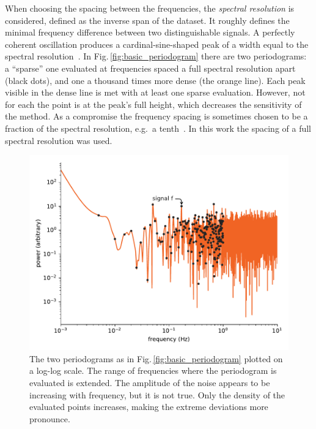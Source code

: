 When choosing the spacing between the frequencies, the \emph{spectral resolution} is considered, defined as the inverse span of the dataset.
It roughly defines the minimal frequency difference between two distinguishable signals. A perfectly coherent oscillation produces a cardinal-sine-shaped peak of a width equal to the spectral resolution~\cite{VanderPlas2017}.
In Fig.\,\ref{fig:basic_periodogram} there are two periodograms: a ``sparse'' one evaluated at frequencies spaced a full spectral resolution apart (black dots), and one a thousand times more dense (the orange line).
Each peak visible in the dense line is met with at least one sparse evaluation. However, not for each the point is at the peak's full height, which decreases the sensitivity of the method. As a compromise the frequency spacing is sometimes chosen to be a fraction of the spectral resolution, e.g.\ a tenth~\cite{Debosscher2007}. In this work the spacing of a full spectral resolution was used.

\begin{figure}
  \centering
  \includegraphics[width=\linewidth]{gfx/axions/basic_periodogram_loglog.pdf}
  \caption{The two periodograms as in Fig.\,\ref{fig:basic_periodogram} plotted on a log-log scale.
  The range of frequencies where the periodogram is evaluated is extended.
  The amplitude of the noise appears to be increasing with frequency, but it is not true.
  Only the density of the evaluated points increases, making the extreme deviations more pronounce.}\label{fig:basic_periodogram_loglog}
\end{figure}

